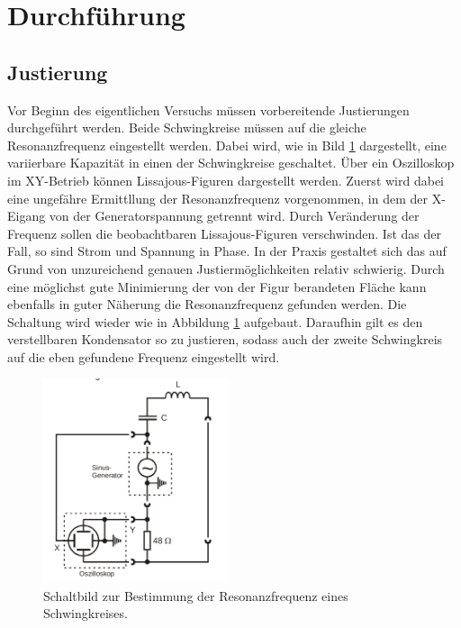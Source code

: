 \section{Durchführung}
\label{sec:Durchführung}

\subsection{Justierung} 
\label{sub:Justierung}


Vor Beginn des eigentlichen Versuchs müssen vorbereitende Justierungen durchgeführt werden. Beide Schwingkreise müssen 
auf die gleiche Resonanzfrequenz eingestellt werden.
Dabei wird, wie in Bild \ref{fig:bild5} dargestellt, eine variierbare Kapazität in einen der Schwingkreise geschaltet. Über ein
Oszilloskop im XY-Betrieb können Lissajous-Figuren dargestellt werden. Zuerst wird dabei eine ungefähre Ermittllung der Resonanzfrequenz vorgenommen, in dem der X-Eigang von der 
Generatorspannung getrennt wird. Durch Veränderung der Frequenz sollen die beobachtbaren Lissajous-Figuren verschwinden. Ist das der Fall, so sind Strom und Spannung in Phase. In der Praxis gestaltet sich das auf Grund von unzureichend genauen Justiermöglichkeiten relativ schwierig.
Durch eine möglichst gute Minimierung der von der Figur berandeten Fläche kann
ebenfalls in guter Näherung die Resonanzfrequenz gefunden werden. Die Schaltung wird wieder wie in Abbildung \ref{fig:bild5} aufgebaut. Daraufhin gilt es den verstellbaren Kondensator so zu justieren, sodass auch der zweite Schwingkreis auf die eben gefundene Frequenz eingestellt wird.


\begin{figure}

    \centering
    \includegraphics[height=6.0cm]{data/Bild5.png}
    \caption{Schaltbild zur Bestimmung der Resonanzfrequenz eines Schwingkreises.}
    \label{fig:bild5}
\end{figure}

